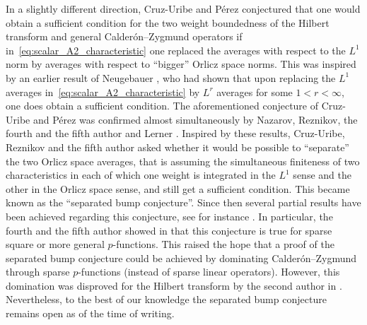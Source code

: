\documentclass{amsart}
\theoremstyle{definition}
\theoremstyle{remark}
\begin{document}
In a slightly different direction, Cruz-Uribe and P\'{e}rez \cite{CrPe} conjectured that one would obtain a sufficient condition for the two weight boundedness of the Hilbert transform and general Calder\'{o}n--Zygmund operators if in~\eqref{eq:scalar_A2_characteristic} one replaced the averages with respect to the $L^1$ norm by averages with respect to ``bigger'' Orlicz space norms. This was inspired by an earlier result of Neugebauer \cite{Ne}, who had shown that upon replacing the $L^1$ averages in~\eqref{eq:scalar_A2_characteristic} by $L^r$ averages for some $1<r<\infty$, one does obtain a sufficient condition. The aforementioned conjecture of Cruz-Uribe and P\'{e}rez \cite{CrPe} was confirmed almost simultaneously by Nazarov, Reznikov, the fourth and the fifth author \cite{NaReTrVo} and Lerner \cite{Le}. Inspired by these results, Cruz-Uribe, Reznikov and the fifth author \cite{CrReVo} asked whether it would be possible to ``separate'' the two Orlicz space averages, that is assuming the simultaneous finiteness of two characteristics in each of which one weight is integrated in the $L^1$ sense and the other in the Orlicz space sense, and still get a sufficient condition. This became known as the ``separated bump conjecture''. Since then several partial results have been achieved regarding this conjecture, see for instance \cite{AnCrMo, CrReVo, LaIV, RaSp, TrVo1}. In particular, the fourth and the fifth author showed in \cite{TrVo1} that this conjecture is true for sparse square or more general $p$-functions. This raised the hope that a proof of the separated bump conjecture could be achieved by dominating Calder\'{o}n--Zygmund through sparse $p$-functions (instead of sparse linear operators). However, this domination was disproved for the Hilbert transform by the second author in \cite{Ka}. Nevertheless, to the best of our knowledge the separated bump conjecture remains open as of the time of writing.
\end{document}
